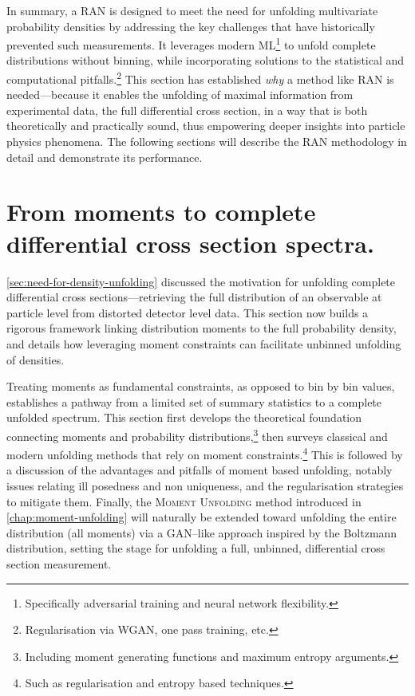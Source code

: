 {{        In summary, a RAN is designed to meet the need for unfolding multivariate probability densities by addressing the key challenges that have historically prevented such measurements.
        It leverages modern ML\footnote{Specifically adversarial training and neural network flexibility.} to unfold complete distributions without binning, while incorporating solutions to the statistical and computational pitfalls.\footnote{Regularisation via WGAN, one pass training, etc.}
        This section has established \emph{why} a method like RAN is needed---because it enables the unfolding of maximal information from experimental data, the full differential cross section, in a way that is both theoretically and practically sound, thus empowering deeper insights into particle physics phenomena.
        The following sections will describe the RAN methodology in detail and demonstrate its performance.

\section{From moments to complete differential cross section spectra.}
\sectionminitoc
    \cref{sec:need-for-density-unfolding} discussed the motivation for unfolding complete differential cross sections---retrieving the full distribution of an observable at particle level from distorted detector level data.
    This section now builds a rigorous framework linking distribution moments to the full probability density, and details how leveraging moment constraints can facilitate unbinned unfolding of densities.
    
    Treating moments as fundamental constraints, as opposed to bin by bin values, establishes a pathway from a limited set of summary statistics to a complete unfolded spectrum.
    This section first develops the theoretical foundation connecting moments and probability distributions,\footnote{Including moment generating functions and maximum entropy arguments.} then surveys classical and modern unfolding methods that rely on moment constraints.\footnote{Such as regularisation and entropy based techniques.}
    This is followed by a discussion of the advantages and pitfalls of moment based unfolding, notably issues relating ill posedness and non uniqueness, and the regularisation strategies to mitigate them.
    Finally, the \textsc{Moment Unfolding} method introduced in \cref{chap:moment-unfolding} will naturally be extended toward unfolding the entire distribution (all moments) via a GAN--like approach inspired by the Boltzmann distribution, setting the stage for unfolding a full, unbinned, differential cross section measurement.

}}
